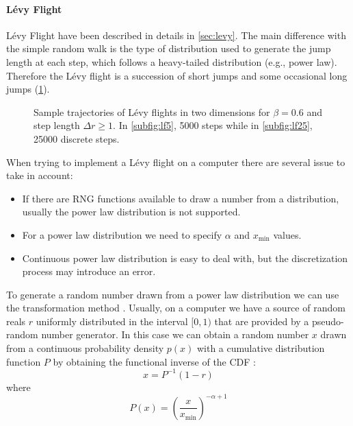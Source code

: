 \paragraph{L\'evy Flight}
L\'evy Flight have been described in details in \sectionname\ref{sec:levy}. The main difference with the simple random walk is the type of distribution used to generate the jump length at each step, which follows a heavy-tailed distribution (e.g., power law). Therefore the L\'evy flight is a succession of short jumps and some occasional long jumps (\figurename\ref{fig:lf}).
\begin{figure}[htbp]
\centering
\caption{Sample trajectories of L\'evy flights in two dimensions for $\beta = 0.6$ and step length $\Delta r \geq 1$. In \ref{subfig:lf5}, 5000 steps while in \ref{subfig:lf25}, 25000 discrete steps.}
\label{fig:lf}
\end{figure}
%
When trying to implement a L\'evy flight on a computer there are several issue to take in account:
\begin{itemize}
	\item If there are RNG functions available to draw a number from a distribution, usually the power law distribution is not supported.
	\item For a power law distribution we need to specify $\alpha$ and $x_{\text{min}}$ values.
	\item Continuous power law distribution is easy to deal with, but the discretization process may introduce an error.
\end{itemize}
%
To generate a random number drawn from a power law distribution we can use the transformation method \cite{william_1997_numerical}. Usually, on a computer we have a source of random reals $r$ uniformly distributed in the interval $[0,1)$ that are provided by a pseudo-random number generator. In this case we can obtain a random number $x$ drawn from a continuous probability density $p(x)$ with a cumulative distribution function $P$ by obtaining the functional inverse of the CDF \cite{clauset_2009_power}:
\begin{equation}
x = P^{-1}(1-r)
\end{equation}
where 
\begin{equation}
P(x) = \left(\frac{x}{x_{\text{min}}}\right)^{-\alpha+1}
\end{equation}

